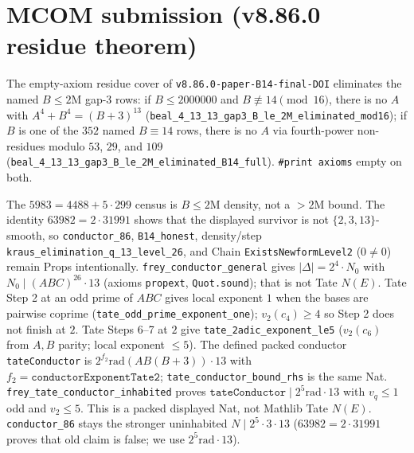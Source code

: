 \documentclass[12pt]{amsart}
\begin{document}
\section{MCOM submission (v8.86.0 residue theorem)}
\begin{theorem}
The empty-axiom residue cover of \texttt{v8.86.0-paper-B14-final-DOI}
eliminates the named $B\le 2\mathrm{M}$ gap-$3$ rows:
if $B\le 2000000$ and $B\not\equiv 14\pmod{16}$, there is no $A$
with $A^4+B^4=(B+3)^{13}$
(\texttt{beal\_4\_13\_13\_gap3\_B\_le\_2M\_eliminated\_mod16});
if $B$ is one of the $352$ named $B\equiv 14$ rows, there is no $A$
via fourth-power non-residues modulo $53$, $29$, and $109$
(\texttt{beal\_4\_13\_13\_gap3\_B\_le\_2M\_eliminated\_B14\_full}).
\texttt{\#print axioms} empty on both.
\end{theorem}
The $5983=4488+5\cdot 299$ census is $B\le 2\mathrm{M}$ density,
not a $>2\mathrm{M}$ bound.
The identity $63982=2\cdot 31991$ shows that the displayed
survivor is not $\{2,3,13\}$-smooth, so
\texttt{conductor\_86}, \texttt{B14\_honest},
density/step \texttt{kraus\_elimination\_q\_13\_level\_26},
and Chain \texttt{ExistsNewformLevel2} ($0\neq 0$)
remain Props intentionally.
\texttt{frey\_conductor\_general} gives
$|\Delta|=2^4\cdot N_0$ with $N_0\mid (ABC)^{26}\cdot 13$
(axioms \texttt{propext}, \texttt{Quot.sound});
that is not Tate $N(E)$.
Tate Step 2 at an odd prime of $ABC$ gives
local exponent $1$ when the bases are pairwise
coprime (\texttt{tate\_odd\_prime\_exponent\_one});
$v_2(c_4)\ge 4$ so Step 2 does not finish at $2$.
Tate Steps 6--7 at $2$ give
\texttt{tate\_2adic\_exponent\_le5}
($v_2(c_6)$ from $A,B$ parity;
local exponent $\le 5$).
The defined packed conductor
\texttt{tateConductor}
is $2^{f_2}\mathrm{rad}(AB(B+3))\cdot 13$
with $f_2=\texttt{conductorExponentTate2}$;
\texttt{tate\_conductor\_bound\_rhs} is the
same Nat.
\texttt{frey\_tate\_conductor\_inhabited}
proves $\texttt{tateConductor}\mid 2^5\mathrm{rad}\cdot 13$
with $v_q\le 1$ odd and $v_2\le 5$.
This is a packed displayed Nat, not Mathlib
Tate $N(E)$.
\texttt{conductor\_86} stays the stronger
uninhabited $N\mid 2^5\cdot 3\cdot 13$
($63982=2\cdot 31991$ proves that old claim
is false; we use $2^5\mathrm{rad}\cdot 13$).
\end{document}
